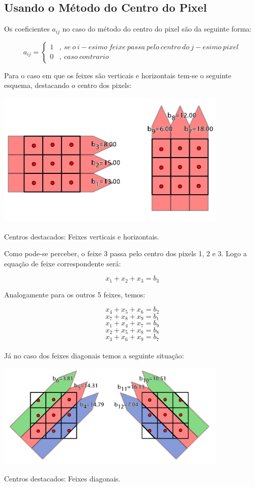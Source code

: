 \documentclass[a4paper, 12pt]{article}
\begin{document}
\subsection{Usando o Método do Centro do Pixel}

Os coeficientes $a_{ij}$ no caso do método do centro do pixel são da seguinte forma:

$$a_{ij}=\begin{cases}
1&{,}\ se\ o\ i-esimo\ feixe\ passa\ pelo\ centro\ do\ j-esimo\ pixel\\
0&{,}\ caso\ contrario
\end{cases}$$

Para o caso em que os feixes são verticais e horizontais tem-se o seguinte esquema, destacando o centro dos pixels:

\begin{center}
    \includegraphics[width=11cm]{03_feixes_horizontais_centro_pixel.fw.png}
    
    Centros destacados: Feixes verticais e horizontais.
\end{center}

Como pode-se perceber, o feixe 3 passa pelo centro dos pixels 1, 2 e 3. Logo a equação de feixe correspondente será:

$$x_1+x_2+x_3=b_3$$

Analogamente para os outros 5 feixes, temos:

$$x_4+x_5+x_6=b_2$$
$$x_7+x_8+x_9=b_1$$
$$x_1+x_4+x_7=b_9$$
$$x_2+x_5+x_8=b_8$$
$$x_3+x_6+x_9=b_7$$\\

Já no caso dos feixes diagonais temos a seguinte situação:

\begin{center}
    \includegraphics[width=11cm]{04_feixes_diagonais_centro_pixel.fw.png}
    
    Centros destacados: Feixes diagonais.
\end{center}
\end{document}
